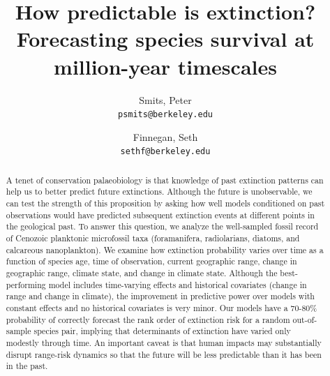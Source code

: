 \documentclass[12pt,letterpaper]{article}
\title{How predictable is extinction? Forecasting species survival at million-year timescales}
\author{
 Smits, Peter\\
 \texttt{psmits@berkeley.edu} 
 \and
 Finnegan, Seth\\
 \texttt{sethf@berkeley.edu}
}
\date{}
\begin{document}
\begin{refsection}

\maketitle

\linenumbers{}
\modulolinenumbers[3]

\begin{abstract}
  A tenet of conservation palaeobiology is that knowledge of past extinction patterns can help us to better predict future extinctions. Although the future is unobservable, we can test the strength of this proposition by asking how well models conditioned on past observations would have predicted subsequent extinction events at different points in the geological past. To answer this question, we analyze the well-sampled fossil record of Cenozoic planktonic microfossil taxa (foramanifera, radiolarians, diatoms, and calcareous nanoplankton). We examine how extinction probability varies over time as a function of species age, time of observation, current geographic range, change in geographic range, climate state, and change in climate state. Although the best-performing model includes time-varying effects and historical covariates (change in range and change in climate), the improvement in predictive power over models with constant effects and no historical covariates is very minor. Our models have a 70-80\% probability of correctly forecast the rank order of extinction risk for a random out-of-sample species pair, implying that determinants of extinction have varied only modestly through time. An important caveat is that human impacts may substantially disrupt range-risk dynamics so that the future will be less predictable than it has been in the past.


\end{abstract}
\end{refsection}
\end{document}
